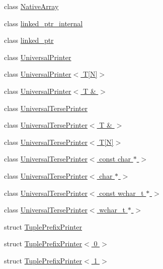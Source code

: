 \begin{DoxyCompactItemize}
class \hyperlink{classtesting_1_1internal_1_1_native_array}{Native\-Array}
\item 
class \hyperlink{classtesting_1_1internal_1_1linked__ptr__internal}{linked\-\_\-ptr\-\_\-internal}
\item 
class \hyperlink{classtesting_1_1internal_1_1linked__ptr}{linked\-\_\-ptr}
\item 
class \hyperlink{classtesting_1_1internal_1_1_universal_printer}{Universal\-Printer}
\item 
class \hyperlink{classtesting_1_1internal_1_1_universal_printer_3_01_t[_n]_4}{Universal\-Printer$<$ T\mbox{[}\-N\mbox{]}$>$}
\item 
class \hyperlink{classtesting_1_1internal_1_1_universal_printer_3_01_t_01_6_01_4}{Universal\-Printer$<$ T \& $>$}
\item 
class \hyperlink{classtesting_1_1internal_1_1_universal_terse_printer}{Universal\-Terse\-Printer}
\item 
class \hyperlink{classtesting_1_1internal_1_1_universal_terse_printer_3_01_t_01_6_01_4}{Universal\-Terse\-Printer$<$ T \& $>$}
\item 
class \hyperlink{classtesting_1_1internal_1_1_universal_terse_printer_3_01_t[_n]_4}{Universal\-Terse\-Printer$<$ T\mbox{[}\-N\mbox{]}$>$}
\item 
class \hyperlink{classtesting_1_1internal_1_1_universal_terse_printer_3_01const_01char_01_5_01_4}{Universal\-Terse\-Printer$<$ const char $\ast$ $>$}
\item 
class \hyperlink{classtesting_1_1internal_1_1_universal_terse_printer_3_01char_01_5_01_4}{Universal\-Terse\-Printer$<$ char $\ast$ $>$}
\item 
class \hyperlink{classtesting_1_1internal_1_1_universal_terse_printer_3_01const_01wchar__t_01_5_01_4}{Universal\-Terse\-Printer$<$ const wchar\-\_\-t $\ast$ $>$}
\item 
class \hyperlink{classtesting_1_1internal_1_1_universal_terse_printer_3_01wchar__t_01_5_01_4}{Universal\-Terse\-Printer$<$ wchar\-\_\-t $\ast$ $>$}
\item 
struct \hyperlink{structtesting_1_1internal_1_1_tuple_prefix_printer}{Tuple\-Prefix\-Printer}
\item 
struct \hyperlink{structtesting_1_1internal_1_1_tuple_prefix_printer_3_010_01_4}{Tuple\-Prefix\-Printer$<$ 0 $>$}
\item 
struct \hyperlink{structtesting_1_1internal_1_1_tuple_prefix_printer_3_011_01_4}{Tuple\-Prefix\-Printer$<$ 1 $>$}
\item 

\end{DoxyCompactItemize}
